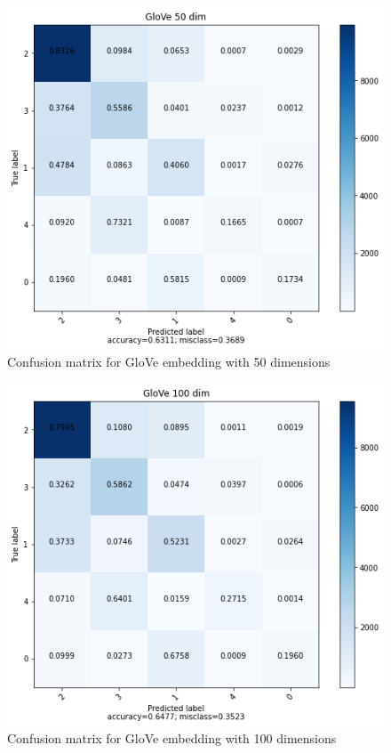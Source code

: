 \documentclass{article}
\begin{document}
\begin{figure}[ht]
    \centering
    \includegraphics[scale=0.4]{../code/images/GloVe50.png}
    \caption{Confusion matrix for GloVe embedding with 50 dimensions}
    \label{fig:g50}
\end{figure}
\begin{figure}[ht]
    \centering
    \includegraphics[scale=0.4]{../code/images/GloVe100.png}
    \caption{Confusion matrix for GloVe embedding with 100 dimensions}
    \label{fig:g100}
\end{figure}
\end{document}
